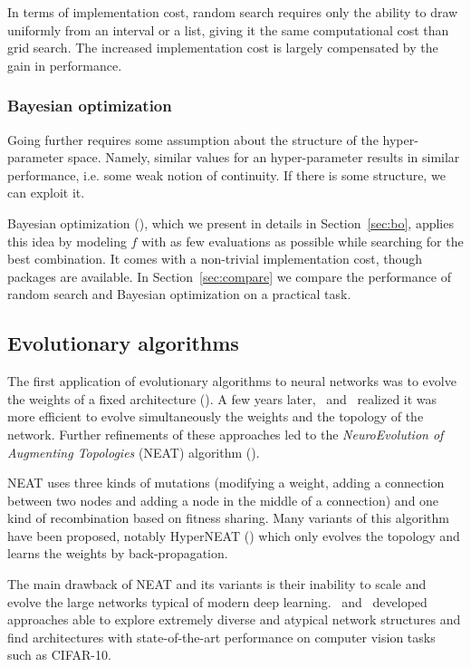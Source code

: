 In terms of implementation cost, random search requires only the ability to draw uniformly from an interval or a list, giving it the same computational cost than grid search. The increased implementation cost is largely compensated by the gain in performance.

\subsubsection{Bayesian optimization}

Going further requires some assumption about the structure of the hyper-parameter space. Namely, similar values for an hyper-parameter results in similar performance, i.e. some weak notion of continuity. If there is some structure, we can exploit it.

Bayesian optimization (\textcite{bergstra2011NIPS}), which we present in details in Section~\ref{sec:bo}, applies this idea by modeling $f$ with as few evaluations as possible while searching for the best combination. It comes with a non-trivial implementation cost, though packages are available. In Section~\ref{sec:compare} we compare the performance of random search and Bayesian optimization on a practical task.

\subsection{Evolutionary algorithms}

The first application of evolutionary algorithms to neural networks was to evolve the weights of a fixed architecture (\textcite{miller1989}). A few years later,~\textcite{braun1993} and~\textcite{angeline1994} realized it was more efficient to evolve simultaneously the weights and the topology of the network. Further refinements of these approaches led to the \textit{NeuroEvolution of Augmenting Topologies} (NEAT) algorithm (\textcite{stanley2002EC}). 

NEAT uses three kinds of mutations (modifying a weight, adding a connection between two nodes and adding a node in the middle of a connection) and one kind of recombination based on fitness sharing. Many variants of this algorithm have been proposed, notably HyperNEAT (\textcite{stanley2009}) which only evolves the topology and learns the weights by back-propagation. 

The main drawback of NEAT and its variants is their inability to scale and evolve the large networks typical of modern deep learning.~\textcite{real2017ICML} and~\textcite{miikkulainen2017} developed approaches able to explore extremely diverse and atypical network structures and find architectures with state-of-the-art performance on computer vision tasks such as CIFAR-10. 


